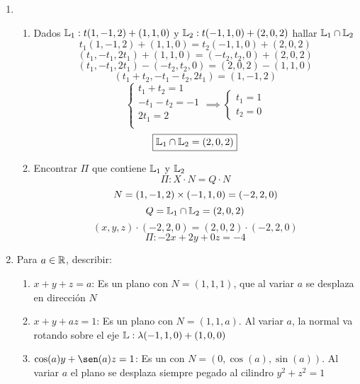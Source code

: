 \documentclass[../practica.root.tex]{subfiles}
\begin{document}
\begin{enumerate}
\begin{enumerate}
          \end{enumerate}

    \item \begin{enumerate}
              \item Dados $\mathbb{L}_1 : t(1, -1, 2) + (1, 1, 0)$ y $\mathbb{L}_2 : t(-1, 1, 0) + (2, 0, 2)$ hallar $\mathbb{L}_1 \cap \mathbb{L}_2$
                    \[ t_1(1, -1, 2) + (1, 1, 0) = t_2(-1, 1, 0) + (2, 0, 2) \]
                    \[ (t_1, -t_1, 2t_1) + (1, 1, 0) = (-t_2, t_2, 0) + (2, 0, 2) \]
                    \[ (t_1, -t_1, 2t_1) - (-t_2, t_2, 0) = (2, 0, 2) - (1, 1, 0) \]
                    \[ (t_1 + t_2, -t_1 - t_2, 2t_1) = (1, -1, 2) \]
                    \[
                        \begin{cases}
                            t_1 + t_2 = 1   \\
                            -t_1 - t_2 = -1 \\
                            2t_1 = 2        \\
                        \end{cases}
                        \implies
                        \begin{cases}
                            t_1 = 1 \\
                            t_2 = 0
                        \end{cases}
                    \] \[
                        \boxed{\mathbb{L}_1 \cap \mathbb{L}_2 = (2, 0, 2)}
                    \]
              \item Encontrar $\Pi$ que contiene $\mathbb{L}_1$  y $\mathbb{L}_2$
                    \[ \Pi : X \cdot N = Q \cdot N\]
                    \[ N = (1, -1, 2)\times(-1, 1, 0) = (-2, 2, 0) \]
                    \[ Q = \mathbb{L}_1 \cap \mathbb{L}_2 = (2, 0, 2)\]
                    \[ (x, y, z)\cdot(-2, 2, 0) = (2, 0, 2)\cdot(-2, 2, 0) \]
                    \[ \boxed{ \Pi : -2x + 2y + 0z = -4} \]
          \end{enumerate}

    \item Para $a \in \mathbb{R}$, describir:
          \begin{enumerate}
              \item $x + y + z = a$: Es un plano con $N = (1, 1, 1)$, que al variar $a$ se desplaza en dirección $N$
              \item $x + y + az = 1$: Es un plano con $N = (1, 1, a)$. Al variar $a$, la normal va rotando sobre el eje $\mathbb{L} : \lambda(-1,1,0) + (1, 0, 0)$
              \item $\cos(a)y + \sen(a)z = 1$: Es un con $N = (0, \cos(a), \sin(a))$. Al variar $a$ el plano se desplaza siempre pegado al cilindro $y^2 + z^2 = 1$
          \end{enumerate}



\end{enumerate}
\end{document}
